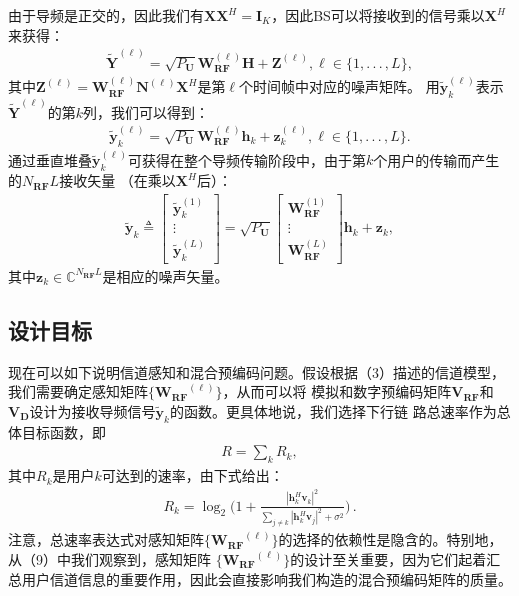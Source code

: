 \documentclass[10pt,journal,final]{IEEEtran}%
\begin{document}
由于导频是正交的，因此我们有$\mathbf{X} \mathbf{X}^{H}=\mathbf{I}_{K}$，因此BS可以将接收到的信号乘以$\mathbf{X}^{H}$来获得：
\begin{align}
\tilde{\mathbf{Y}}^{(\ell)}=\sqrt{P_{\mathbf{U}}}\mathbf{W}_{\mathbf{R}\mathbf{F}}^{(\ell)}\mathbf{H}+\mathbf{Z}^{(\ell)},
\ell \in\{1,.\,.\,.\, ,L\},  
\end{align}
其中$\mathbf{Z}^{(\ell)}=\mathbf{W}_{\mathbf{RF}}^{(\ell)}\mathbf{N}^{(\ell)}\mathbf{X}^{H}$是第$\ell$个时间帧中对应的噪声矩阵。
用$\tilde{\mathbf{y}}_{k}^{(\ell)}$表示$\tilde{\mathbf{Y}}^{(\ell)}$的第$k$列，我们可以得到：
\begin{align}
\tilde{\mathbf{y}}_{k}^{(\ell)}=\sqrt{P_{\mathbf{U}}}\mathbf{W}_{\mathbf{R}\mathbf{F}}^{(\ell)}\mathbf{h}_{k}+\mathbf{z}_{k}^{(\ell)},
\ell \in\{1,.\, .\, .\, ,L\}.
\end{align}
通过垂直堆叠$\tilde{\mathbf{y}}_{k}^{(\ell)}$可获得在整个导频传输阶段中，由于第$k$个用户的传输而产生的$N_{\mathbf{RF}}L$接收矢量
（在乘以$\mathbf{X}^{H}$后）：
\begin{align}
\tilde{\mathbf{y}}_{k}\triangleq 
\begin{bmatrix}
    \tilde{\mathbf{y}}_{k}^{(1)} \\
    \vdots \\
    \tilde{\mathbf{y}}_{k}^{(L)}
\end{bmatrix}
=\sqrt{P_{\mathbf{U}}} 
\begin{bmatrix}
    \mathbf{W}_{\mathbf{RF}}^{(1)} \\
    \vdots \\
    \mathbf{W}_{\mathbf{RF}}^{(L)}
\end{bmatrix}
\mathbf{h}_{k}+\mathbf{z}_{k}, 
\end{align}
其中$\mathbf{z}_{k} \in \mathbb{C}^{N_{\mathbf{RF}}L}$是相应的噪声矢量。
\vspace{-2.0em}
\subsection{设计目标}
\vspace{0.2em}
现在可以如下说明信道感知和混合预编码问题。假设根据（3）描述的信道模型，我们需要确定感知矩阵$\{\mathbf{W_{RF}}^{(\ell)}\}$，从而可以将
模拟和数字预编码矩阵$\mathbf{V_{RF}}$和$\mathbf{V_{D}}$设计为接收导频信号$\tilde{\mathbf{y}}_{k}$的函数。更具体地说，我们选择下行链
路总速率作为总体目标函数，即
\begin{align}
R=\sum_{k}^{}R_{k},  
\end{align}
其中$R_{k}$是用户$k$可达到的速率，由下式给出：
\begin{align}
R_{k}=\log_{2}\biggl(1+\frac{|\mathbf{h}_{k}^{H}\mathbf{v}_{k}|^{2}}{\sum_{j\neq k} |\mathbf{h}_{k}^{H}\mathbf{v}_{j}|^{2}
+\sigma ^{2}} \biggr)\,.
\end{align}
注意，总速率表达式对感知矩阵$\{\mathbf{W_{RF}}^{(\ell)}\}$的选择的依赖性是隐含的。特别地，从（9）中我们观察到，感知矩阵
$\{\mathbf{W_{RF}}^{(\ell)}\}$的设计至关重要，因为它们起着汇总用户信道信息的重要作用，因此会直接影响我们构造的混合预编码矩阵的质量。
\vspace{-0.3em}
\end{document}
